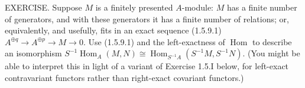 EXERCISE. Suppose $M$ is a finitely presented $A$-module: $M$ has a finite number of generators, and with these generators it has a finite number of relations; or, equivalently, and usefully, fits in an exact sequence (1.5.9.1) $A^{\oplus q} \to A^{\oplus p} \to M \to 0$. Use (1.5.9.1) and the left-exactness of $\operatorname{Hom}$ to describe an isomorphism $S^{-1}\operatorname{Hom}_A(M,N) \cong \operatorname{Hom}_{S^{-1}A}(S^{-1}M,S^{-1}N)$. (You might be able to interpret this in light of a variant of Exercise 1.5.I below, for left-exact contravariant functors rather than right-exact covariant functors.)
